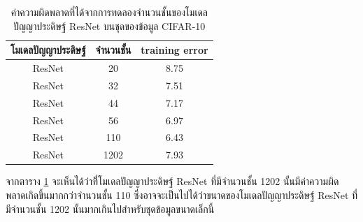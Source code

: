 \begin{table}[!ht]
	\centering
	\begin{tabular}{|c|c|c|}
		\hline
		{โมเดลปัญญาประดิษฐ์}				&{จำนวนชั้น}					&{training error}		\\
		\hline
		ResNet						& 20							& 8.75				\\
		ResNet						& 32							& 7.51				\\
		ResNet						& 44							& 7.17				\\
		ResNet						& 56							& 6.97				\\
		ResNet						& 110						& 6.43				\\
		ResNet						& 1202						& 7.93				\\
		\hline
	\end{tabular}
	\caption{ค่าความผิดพลาดที่ได้จากการทดลองจำนวนชั้นของโมเดลปัญญาประดิษฐ์ ResNet บนชุดของข้อมูล CIFAR-10}
	\label{tab: Classification error}
\end{table}
จากตาราง \ref{tab: Classification error} จะเห็นได้ว่าที่ีโมเดลปัญญาประดิษฐ์ ResNet ที่มีจำนวนชั้น 1202 นั้นมีค่าความผิดพลาดเกิดขึ้นมากกว่าจำนวนชั้น 110 ซึ่งอาจจะเป็นไปได้ว่าขนาดของโมเดลปัญญาประดิษฐ์ ResNet ที่มีจำนวนชั้น 1202 นั้นมากเกินไปสำหรับชุดข้อมูลขนาดเล็กนี้